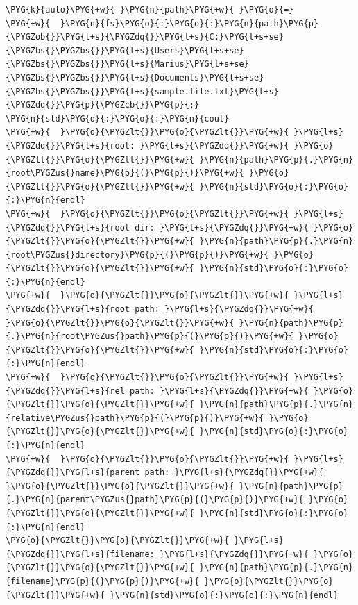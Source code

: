\begin{itemize}
\begin{codeblockbg}
\begin{Verbatim}[commandchars=\\\{\},breaklines=true,breakanywhere=true,fontsize=\codefont,xleftmargin=17bp]
\PYG{k}{auto}\PYG{+w}{ }\PYG{n}{path}\PYG{+w}{ }\PYG{o}{=}
\PYG{+w}{  }\PYG{n}{fs}\PYG{o}{:}\PYG{o}{:}\PYG{n}{path}\PYG{p}{\PYGZob{}}\PYG{l+s}{\PYGZdq{}}\PYG{l+s}{C:}\PYG{l+s+se}{\PYGZbs{}\PYGZbs{}}\PYG{l+s}{Users}\PYG{l+s+se}{\PYGZbs{}\PYGZbs{}}\PYG{l+s}{Marius}\PYG{l+s+se}{\PYGZbs{}\PYGZbs{}}\PYG{l+s}{Documents}\PYG{l+s+se}{\PYGZbs{}\PYGZbs{}}\PYG{l+s}{sample.file.txt}\PYG{l+s}{\PYGZdq{}}\PYG{p}{\PYGZcb{}}\PYG{p}{;}
\PYG{n}{std}\PYG{o}{:}\PYG{o}{:}\PYG{n}{cout}
\PYG{+w}{  }\PYG{o}{\PYGZlt{}}\PYG{o}{\PYGZlt{}}\PYG{+w}{ }\PYG{l+s}{\PYGZdq{}}\PYG{l+s}{root: }\PYG{l+s}{\PYGZdq{}}\PYG{+w}{ }\PYG{o}{\PYGZlt{}}\PYG{o}{\PYGZlt{}}\PYG{+w}{ }\PYG{n}{path}\PYG{p}{.}\PYG{n}{root\PYGZus{}name}\PYG{p}{(}\PYG{p}{)}\PYG{+w}{ }\PYG{o}{\PYGZlt{}}\PYG{o}{\PYGZlt{}}\PYG{+w}{ }\PYG{n}{std}\PYG{o}{:}\PYG{o}{:}\PYG{n}{endl}
\PYG{+w}{  }\PYG{o}{\PYGZlt{}}\PYG{o}{\PYGZlt{}}\PYG{+w}{ }\PYG{l+s}{\PYGZdq{}}\PYG{l+s}{root dir: }\PYG{l+s}{\PYGZdq{}}\PYG{+w}{ }\PYG{o}{\PYGZlt{}}\PYG{o}{\PYGZlt{}}\PYG{+w}{ }\PYG{n}{path}\PYG{p}{.}\PYG{n}{root\PYGZus{}directory}\PYG{p}{(}\PYG{p}{)}\PYG{+w}{ }\PYG{o}{\PYGZlt{}}\PYG{o}{\PYGZlt{}}\PYG{+w}{ }\PYG{n}{std}\PYG{o}{:}\PYG{o}{:}\PYG{n}{endl}
\PYG{+w}{  }\PYG{o}{\PYGZlt{}}\PYG{o}{\PYGZlt{}}\PYG{+w}{ }\PYG{l+s}{\PYGZdq{}}\PYG{l+s}{root path: }\PYG{l+s}{\PYGZdq{}}\PYG{+w}{ }\PYG{o}{\PYGZlt{}}\PYG{o}{\PYGZlt{}}\PYG{+w}{ }\PYG{n}{path}\PYG{p}{.}\PYG{n}{root\PYGZus{}path}\PYG{p}{(}\PYG{p}{)}\PYG{+w}{ }\PYG{o}{\PYGZlt{}}\PYG{o}{\PYGZlt{}}\PYG{+w}{ }\PYG{n}{std}\PYG{o}{:}\PYG{o}{:}\PYG{n}{endl}
\PYG{+w}{  }\PYG{o}{\PYGZlt{}}\PYG{o}{\PYGZlt{}}\PYG{+w}{ }\PYG{l+s}{\PYGZdq{}}\PYG{l+s}{rel path: }\PYG{l+s}{\PYGZdq{}}\PYG{+w}{ }\PYG{o}{\PYGZlt{}}\PYG{o}{\PYGZlt{}}\PYG{+w}{ }\PYG{n}{path}\PYG{p}{.}\PYG{n}{relative\PYGZus{}path}\PYG{p}{(}\PYG{p}{)}\PYG{+w}{ }\PYG{o}{\PYGZlt{}}\PYG{o}{\PYGZlt{}}\PYG{+w}{ }\PYG{n}{std}\PYG{o}{:}\PYG{o}{:}\PYG{n}{endl}
\PYG{+w}{  }\PYG{o}{\PYGZlt{}}\PYG{o}{\PYGZlt{}}\PYG{+w}{ }\PYG{l+s}{\PYGZdq{}}\PYG{l+s}{parent path: }\PYG{l+s}{\PYGZdq{}}\PYG{+w}{ }\PYG{o}{\PYGZlt{}}\PYG{o}{\PYGZlt{}}\PYG{+w}{ }\PYG{n}{path}\PYG{p}{.}\PYG{n}{parent\PYGZus{}path}\PYG{p}{(}\PYG{p}{)}\PYG{+w}{ }\PYG{o}{\PYGZlt{}}\PYG{o}{\PYGZlt{}}\PYG{+w}{ }\PYG{n}{std}\PYG{o}{:}\PYG{o}{:}\PYG{n}{endl}
\PYG{o}{\PYGZlt{}}\PYG{o}{\PYGZlt{}}\PYG{+w}{ }\PYG{l+s}{\PYGZdq{}}\PYG{l+s}{filename: }\PYG{l+s}{\PYGZdq{}}\PYG{+w}{ }\PYG{o}{\PYGZlt{}}\PYG{o}{\PYGZlt{}}\PYG{+w}{ }\PYG{n}{path}\PYG{p}{.}\PYG{n}{filename}\PYG{p}{(}\PYG{p}{)}\PYG{+w}{ }\PYG{o}{\PYGZlt{}}\PYG{o}{\PYGZlt{}}\PYG{+w}{ }\PYG{n}{std}\PYG{o}{:}\PYG{o}{:}\PYG{n}{endl}

\end{Verbatim}
\end{codeblockbg}
\end{itemize}
